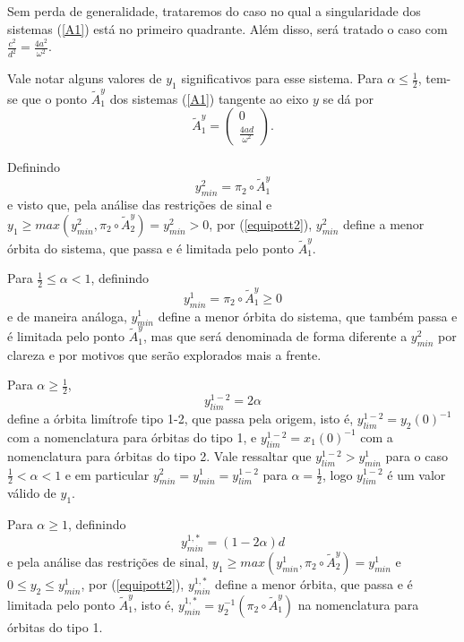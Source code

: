 Sem perda de generalidade, trataremos do caso no qual a singularidade dos sistemas (\ref{A1}) está no primeiro quadrante. Além disso, será tratado o caso com $\frac{c^2}{d^2}=\frac{4a^2}{\omega^2}$.

Vale notar alguns valores de $y_1$ significativos para esse sistema. Para $\alpha\leq\frac{1}{2}$, tem-se que o ponto $\tilde{A}_1^y$ dos sistemas (\ref{A1}) tangente ao eixo $y$ se dá por
\begin{equation}
\label{A2tany}
\tilde{A}_1^y=  \begin{pmatrix}
0\\
\frac{4ad}{\omega^2}
\end{pmatrix}.
\end{equation}

Definindo
$$
y_{min}^2 = \pi_2\circ\tilde{A}_1^y
$$
e visto que, pela análise das restrições de sinal e $y_1\geq max(y_{min}^2,\pi_2\circ\tilde{A}_2^y)=y_{min}^2>0$, por (\ref{equipott2}), $y_{min}^2$ define a menor órbita do sistema, que passa e é limitada pelo ponto $\tilde{A}_1^y$.

Para $\frac{1}{2}\leq\alpha<1$, definindo
$$
y_{min}^1 = \pi_2\circ\tilde{A}_1^y\geq0
$$
e de maneira análoga, $y_{min}^1$ define a menor órbita do sistema, que também passa e é limitada pelo ponto $\tilde{A}_1^y$, mas que será denominada de forma diferente a $y_{min}^2$ por clareza e por motivos que serão explorados mais a frente. 

Para $\alpha\geq\frac{1}{2}$,  
$$
y_{lim}^{1-2}=2\alpha
$$
define a órbita limítrofe tipo 1-2, que passa pela origem, isto é, $y_{lim}^{1-2}=y_2(0)^{-1}$ com a nomenclatura para órbitas do tipo 1, e $y_{lim}^{1-2}=x_1(0)^{-1}$ com a nomenclatura para órbitas do tipo 2. Vale ressaltar que $y_{lim}^{1-2}> y_{min}^1$ para o caso $\frac{1}{2}<\alpha<1$ e em particular $
y_{min}^2=y_{min}^1=y_{lim}^{1-2}$ para $\alpha=\frac{1}{2}$, logo $y_{lim}^{1-2}$ é um valor válido de $y_1$.

Para $\alpha\geq1$, definindo
$$y_{min}^{1,*}=(1-2\alpha)d$$
e pela análise das restrições de sinal, $y_1\geq max(y_{min}^1,\pi_2\circ\tilde{A}_2^y)=y_{min}^1$ e $0\leq y_2\leq y_{min}^1$, por (\ref{equipott2}), $y_{min}^{1,*}$ define a menor órbita, que passa e é limitada pelo ponto $\tilde{A}^y_1$, isto é, $y_{min}^{1,*}=y_2^{-1}(\pi_2\circ\tilde{A}_1^y)$ na nomenclatura para órbitas do tipo 1.

